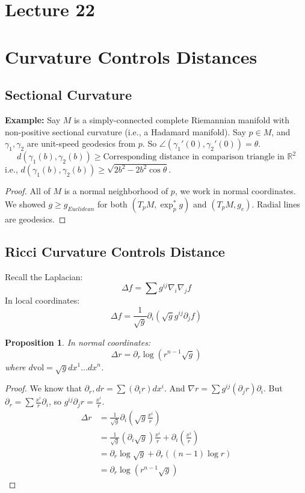 \documentclass[11pt, a4paper]{article}
\theoremstyle{plain}
\newtheorem{proposition}[theorem]{Proposition}
\theoremstyle{definition}
\theoremstyle{remark}
\begin{document}
\newpage
{
    \section{Lecture 22}
    
\section*{Curvature Controls Distances}

\subsection{Sectional Curvature}
\textbf{Example:} Say $M$ is a simply-connected complete Riemannian manifold with non-positive sectional curvature (i.e., a Hadamard manifold).
Say $p \in M$, and $\gamma_1, \gamma_2$ are unit-speed geodesics from $p$. So $\angle(\gamma_1'(0), \gamma_2'(0)) = \theta$.
\[ d(\gamma_1(b), \gamma_2(b)) \ge \text{Corresponding distance in comparison triangle in } \mathbb{R}^2 \]
i.e., $d(\gamma_1(b), \gamma_2(b)) \ge \sqrt{2b^2 - 2b^2 \cos\theta}$.

\begin{proof}
All of $M$ is a normal neighborhood of $p$, we work in normal coordinates. We showed $g \ge g_{Euclidean}$ for both $(T_pM, \exp_p^* g)$ and $(T_pM, g_e)$. Radial lines are geodesics.
\end{proof}

\subsection{Ricci Curvature Controls Distance}
Recall the Laplacian:
\[ \Delta f = \sum g^{ij} \nabla_i \nabla_j f \]
In local coordinates:
\[ \Delta f = \frac{1}{\sqrt{g}} \partial_i (\sqrt{g} g^{ij} \partial_j f) \]

\begin{proposition}
In normal coordinates:
\[ \Delta r = \partial_r \log(r^{n-1} \sqrt{g}) \]
where $d\text{vol} = \sqrt{g} dx^1 \dots dx^n$.
\end{proposition}

\begin{proof}
We know that $\partial_r, dr = \sum (\partial_i r) dx^i$. And $\nabla r = \sum g^{ij} (\partial_j r) \partial_i$.
But $\partial_r = \sum \frac{x^i}{r} \partial_i$, so $g^{ij} \partial_j r = \frac{x^i}{r}$.
\begin{align*}
\Delta r &= \frac{1}{\sqrt{g}} \partial_i \left( \sqrt{g} \frac{x^i}{r} \right) \\
&= \frac{1}{\sqrt{g}} (\partial_i \sqrt{g}) \frac{x^i}{r} + \partial_i \left( \frac{x^i}{r} \right) \\
&= \partial_r \log \sqrt{g} + \partial_r ((n-1) \log r) \\
&= \partial_r \log (r^{n-1} \sqrt{g})
\end{align*}
\end{proof}

}
\end{document}
